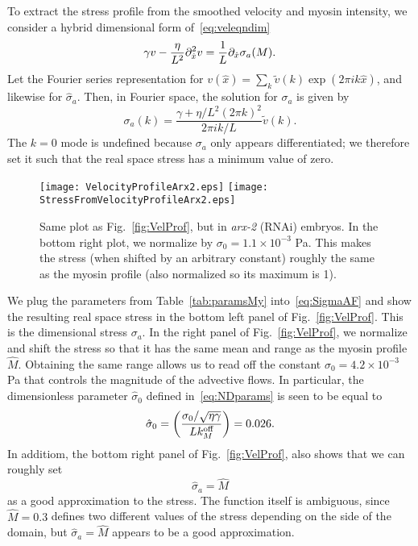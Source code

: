 \documentclass[11pt]{article}
\newcommand{\6}[1]{#1_{\text{6}}}
\newcommand{\3}[1]{#1_{\text{3}}}
\newcommand{\My}[1]{#1_M}
\begin{document}
To extract the stress profile from the smoothed velocity and myosin intensity, we consider a hybrid dimensional form of\ \eqref{eq:veleqndim}
\begin{equation*}
\gamma v -\frac{ \eta}{L^2} \partial_{\hat{x}}^2 v = \frac{1}{L} \partial_{\hat{x}}  \sigma_a(M). 
\end{equation*}
Let the Fourier series representation for $v(\hat x)= \sum_k \tilde v(k) \exp{\left(2 \pi i k \hat x \right)}$, and likewise for $\hat \sigma_a$. Then, in Fourier space, the solution for $\sigma_a$ is given by 
\begin{equation}
\label{eq:SigmaAF}
\sigma_a(k) = \frac{\gamma+ \eta/L^2 \left(2 \pi k\right)^2}{2 \pi i k/L} \tilde v(k). 
\end{equation}
The $k=0$ mode is undefined because $\sigma_a$ only appears differentiated; we therefore set it such that the real space stress has a minimum value of zero. 

\begin{figure}
\centering
\texttt{[image: VelocityProfileArx2.eps]}
\texttt{[image: StressFromVelocityProfileArx2.eps]}
\caption{\label{fig:VelProfArx2} Same plot as Fig.\ \ref{fig:VelProf}, but in \emph{arx-2} (RNAi) embryos. In the bottom right plot, we normalize by $\sigma_0=1.1 \times 10^{-3}$ Pa. This makes the stress (when shifted by an arbitrary constant) roughly the same as the myosin profile (also normalized so its maximum is 1).}
\end{figure}

We plug the parameters from Table\ \ref{tab:paramsMy} into\ \eqref{eq:SigmaAF} and show the resulting real space stress in the bottom left panel of Fig.\ \ref{fig:VelProf}. This is the dimensional stress $\sigma_a$. In the right panel of Fig.\ \ref{fig:VelProf}, we normalize and shift the stress so that it has the same mean and range as the myosin profile $\hat M$. Obtaining the same range allows us to read off the constant $\sigma_0=4.2 \times 10^{-3}$ Pa that controls the magnitude of the advective flows. In particular, the dimensionless parameter $\hat{\sigma}_0$ defined in\ \eqref{eq:NDparams} is seen to be equal to
\begin{equation}
\hat{\sigma}_0 = \left(\frac{\sigma_0/ \sqrt{\eta \gamma} }{L \My{\koff}}\right)  = 0.026.
\end{equation}
In additiom, the bottom right panel of Fig.\ \ref{fig:VelProf}, also shows that we can roughly set
\begin{equation}
\hat \sigma_a=\hat M
\end{equation}
as a good approximation to the stress. The function itself is ambiguous, since $\hat M=0.3$ defines two different values of the stress depending on the side of the domain, but $\hat \sigma_a=\hat M$ appears to be a good approximation.
\end{document}
